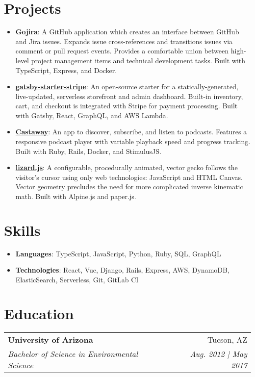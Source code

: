 \documentclass[letterpaper,11pt]{article}
\makeatletter
\newcommand{\resumeSubheading}[4]{
  \vspace{5pt}
  \begin{tabular*}{0.97\textwidth}[t]{l@{\extracolsep{\fill}}r}
    \textbf{#1} & #2 \\
    \textit{\small#3} & \textit{\small #4} \\
  \end{tabular*}\vspace{-5pt}
}
\newenvironment{resumeList}{\begin{itemize}[leftmargin=*]}{\end{itemize}\vspace{-5pt}}
\newcommand{\resumeTitledItem}[2]{
  \item\small{
    \textbf{#1}{: #2 \vspace{-2pt}}
  }
}
\makeatother
\begin{document}
\section{Projects}
  \begin{resumeList}
    \resumeTitledItem{Gojira}
      {A GitHub application which creates an interface between GitHub and Jira issues. Expands issue cross-references and transitions issues via comment or pull request events. Provides a comfortable union between high-level project management items and technical development tasks. Built with TypeScript, Express, and Docker.}
    \resumeTitledItem{\href{https://github.com/brxck/gatsby-starter-stripe}{gatsby-starter-stripe}}
      {An open-source starter for a statically-generated, live-updated, serverless storefront and admin dashboard. Built-in inventory, cart, and checkout is integrated with Stripe for payment processing. Built with Gatsby, React, GraphQL, and AWS Lambda.}
    \resumeTitledItem{\href{https://castaway.by.brxck.dev}{Castaway}}
      {An app to discover, subscribe, and listen to podcasts. Features a responsive podcast player with variable playback speed and progress tracking. Built with Ruby, Rails, Docker, and StimulusJS.}
    \resumeTitledItem{\href{https://brxck.github.io/lizard.js/}{lizard.js}}
      {A configurable, procedurally animated, vector gecko follows the visitor's cursor using only web technologies: JavaScript and HTML Canvas. Vector geometry precludes the need for more complicated inverse kinematic math. Built with Alpine.js and paper.js.}
  \end{resumeList}

\section{Skills}
  \begin{resumeList}
    \resumeTitledItem{Languages}{TypeScript, JavaScript, Python, Ruby, SQL, GraphQL}
    \resumeTitledItem{Technologies}{React, Vue, Django, Rails, Express, AWS, DynamoDB, ElasticSearch, Serverless, Git, GitLab CI}
  \end{resumeList}

\section{Education}
  \resumeSubheading
  {University of Arizona}{Tucson, AZ}
  {Bachelor of Science in Environmental Science}{Aug. 2012 | May 2017}
\end{document}
